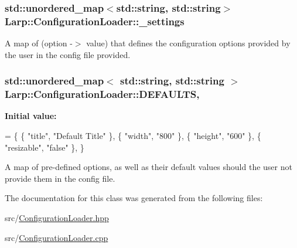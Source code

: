 \subsubsection[{\texorpdfstring{\+\_\+settings}{_settings}}]{\setlength{\rightskip}{0pt plus 5cm}std\+::unordered\+\_\+map$<$std\+::string, std\+::string$>$ Larp\+::\+Configuration\+Loader\+::\+\_\+settings\hspace{0.3cm}{\ttfamily [private]}}\hypertarget{classLarp_1_1ConfigurationLoader_ab952b0b19ffa465a73fd58302fccb124}{}\label{classLarp_1_1ConfigurationLoader_ab952b0b19ffa465a73fd58302fccb124}
A map of (option -\/$>$ value) that defines the configuration options provided by the user in the config file provided. 
\subsubsection[{\texorpdfstring{D\+E\+F\+A\+U\+L\+TS}{DEFAULTS}}]{\setlength{\rightskip}{0pt plus 5cm}std\+::unordered\+\_\+map$<$ std\+::string, std\+::string $>$ Larp\+::\+Configuration\+Loader\+::\+D\+E\+F\+A\+U\+L\+TS\hspace{0.3cm}{\ttfamily [static]}, {\ttfamily [private]}}\hypertarget{classLarp_1_1ConfigurationLoader_a5b5d1d47f1f5cced025a85d248ae57e7}{}\label{classLarp_1_1ConfigurationLoader_a5b5d1d47f1f5cced025a85d248ae57e7}
{\bfseries Initial value\+:}
\begin{DoxyCode}
= \{
    \{ \textcolor{stringliteral}{"title"},     \textcolor{stringliteral}{"Default Title"} \},
    \{ \textcolor{stringliteral}{"width"},     \textcolor{stringliteral}{"800"} \},
    \{ \textcolor{stringliteral}{"height"},    \textcolor{stringliteral}{"600"} \},
    \{ \textcolor{stringliteral}{"resizable"}, \textcolor{stringliteral}{"false"} \},
\}
\end{DoxyCode}
A map of pre-\/defined options, as well as their default values should the user not provide them in the config file. 

The documentation for this class was generated from the following files\+:\begin{DoxyCompactItemize}
\item 
src/\hyperlink{ConfigurationLoader_8hpp}{Configuration\+Loader.\+hpp}\item 
src/\hyperlink{ConfigurationLoader_8cpp}{Configuration\+Loader.\+cpp}\end{DoxyCompactItemize}
